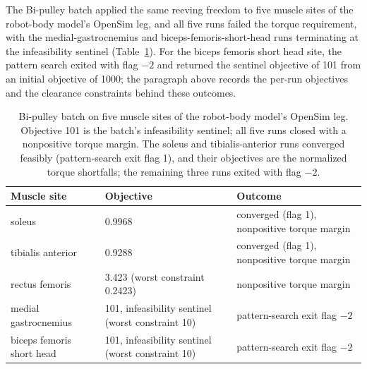 The Bi-pulley batch applied the same reeving freedom to five muscle sites of the robot-body model's OpenSim leg, and all five runs failed the torque requirement, with the medial-gastrocnemius and biceps-femoris-short-head runs terminating at the infeasibility sentinel (Table~\ref{tab:bipulley_batch}). For the biceps femoris short head site, the pattern search exited with flag $-2$ and returned the sentinel objective of 101 from an initial objective of 1000; the paragraph above records the per-run objectives and the clearance constraints behind these outcomes.

\begin{table}[htbp]
\caption{Bi-pulley batch on five muscle sites of the robot-body model's OpenSim leg. Objective 101 is the batch's infeasibility sentinel; all five runs closed with a nonpositive torque margin. The soleus and tibialis-anterior runs converged feasibly (pattern-search exit flag 1), and their objectives are the normalized torque shortfalls; the remaining three runs exited with flag $-2$.}
\label{tab:bipulley_batch}
\small
\begin{tabular}{@{}lll@{}}
\toprule
\textbf{Muscle site} & \textbf{Objective} & \textbf{Outcome} \\
\midrule
soleus                    & 0.9968                                       & converged (flag 1), nonpositive torque margin \\
tibialis anterior         & 0.9288                                       & converged (flag 1), nonpositive torque margin \\
rectus femoris            & 3.423 (worst constraint 0.2423)              & nonpositive torque margin \\
medial gastrocnemius      & 101, infeasibility sentinel (worst constraint 10) & pattern-search exit flag $-2$ \\
biceps femoris short head & 101, infeasibility sentinel (worst constraint 10) & pattern-search exit flag $-2$ \\
\bottomrule
\end{tabular}
\end{table}

